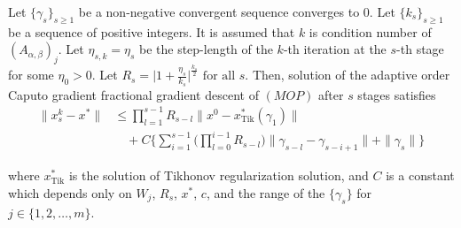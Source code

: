 \documentclass[smallextended,referee,envcountsect]{svjour3}
\begin{document}
\begin{theorem}\label{thm6}
Let $\{\gamma_s\}_{s \geq 1}$ be a non-negative convergent sequence converges to $0$. Let $\{k_s\}_{s \geq 1}$ be a sequence of positive integers. It is assumed that $k$ is  condition number of $(A_{\alpha,\beta})_j$. Let $\eta_{s,k}= \eta_s$ be the step-length of the $k$-th iteration at the $s$-th stage for some $\eta_0 > 0$. Let
\(
R_s = \Big| 1 + \frac{\eta_s}{k_s} \Big|^\frac{k_s}{2} \text{ for all } s.
\) Then, solution of the adaptive order Caputo gradient fractional gradient descent of $(MOP)$ after $s$ stages satisfies
\begin{align*}
\Big\| x_s^{k} - x^* \Big\|
&\leq \prod_{l=1}^{s-1} R_{s-l} \Big\| x^{0} - x^*_{\text{Tik}}(\gamma_1) \Big\| \\
&\quad + C \Big\{ \sum_{i=1}^{s-1} \Big( \prod_{l=0}^{i-1} R_{s-l} \Big) \Big\| \gamma_{s-l} - \gamma_{s-i+1} \Big\| + \|\gamma_s\| \Big\}
\end{align*}


where $x^*_{\text{Tik}}$ is the solution of Tikhonov regularization solution, and $C$ is a constant which depends only on $W_j$, $R_s$, $x^*$, $c$, and the range of the $\{\gamma_s\}$ for $j\in\{1,2,\dots,m\}.$


\end{theorem}
\end{document}
